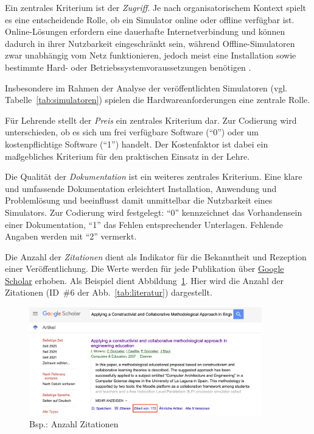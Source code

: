 Ein zentrales Kriterium ist der \textit{Zugriff}. Je nach organisatorischem Kontext spielt es eine entscheidende Rolle, ob ein Simulator online oder offline verfügbar ist. Online-Lösungen erfordern eine dauerhafte Internetverbindung und können dadurch in ihrer Nutzbarkeit eingeschränkt sein, während Offline-Simulatoren zwar unabhängig vom Netz funktionieren, jedoch meist eine Installation sowie bestimmte Hard- oder Betriebssystemvoraussetzungen benötigen \parencites[S.~11f]{ferguson_importance_2024}[S.~1380]{sharma_study_2022}.

Insbesondere im Rahmen der Analyse der veröffentlichten Simulatoren (vgl. Tabelle~\ref{tab:simulatoren}) spielen die Hardwareanforderungen eine zentrale Rolle.

Für Lehrende stellt der \textit{Preis} ein zentrales Kriterium dar. Zur Codierung wird unterschieden, ob es sich um frei verfügbare Software (\enquote{0}) oder um kostenpflichtige Software (\enquote{1}) handelt. Der Kostenfaktor ist dabei ein maßgebliches Kriterium für den praktischen Einsatz in der Lehre.

Die Qualität der \textit{Dokumentation} ist ein weiteres zentrales Kriterium. Eine klare und umfassende Dokumentation erleichtert Installation, Anwendung und Problemlösung und beeinflusst damit unmittelbar die Nutzbarkeit eines Simulators. Zur Codierung wird festgelegt: \enquote{0} kennzeichnet das Vorhandensein einer Dokumentation, \enquote{1} das Fehlen entsprechender Unterlagen. Fehlende Angaben werden mit \enquote{2} vermerkt.

Die Anzahl der \textit{Zitationen} dient als Indikator für die Bekanntheit und Rezeption einer Veröffentlichung. Die Werte werden für jede Publikation über \href{https://scholar.google.de/}{Google Scholar} erhoben. Als Beispiel dient Abbildung~\ref{fig:anzahl_zitationen}. Hier wird die Anzahl der Zitationen (ID~\#6 der Abb.~\ref{tab:literatur}) dargestellt.

\begin{figure}[htbp]
    \centering
    \caption{Bsp.: Anzahl Zitationen}
    \label{fig:anzahl_zitationen}
    \includegraphics[width=0.90\textwidth]{img/Anzahl_Zitationen.png}
\end{figure}

